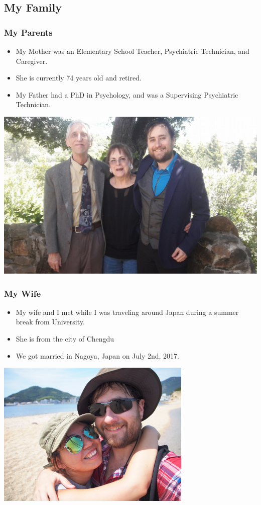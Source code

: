\documentclass{beamer}
\begin{document}
	
		\subsection{My Family}
		
			\begin{frame}
	\frametitle{My Parents}
	\begin{itemize}
		\item My Mother was an Elementary School Teacher, Psychiatric Technician, and Caregiver.
		\item She is currently 74 years old and retired.
		\item My Father had a PhD in Psychology, and was a Supervising Psychiatric Technician.  
	\end{itemize}
	\begin{center}
		\includegraphics[width = 1.0\textwidth]{images/parents.png}
	\end{center}
\end{frame}
		
			\begin{frame}
				\frametitle{My Wife}
				\begin{itemize}
					\item My wife and I met while I was traveling around Japan during a summer break from University.
					\item She is from the city of Chengdu
					\item We got married in Nagoya, Japan on July 2nd, 2017.
				\end{itemize}
				\begin{center}
					\includegraphics[width = 0.7\textwidth]{images/P8114378.JPG}
				\end{center}
			\end{frame}
		
\end{document}
